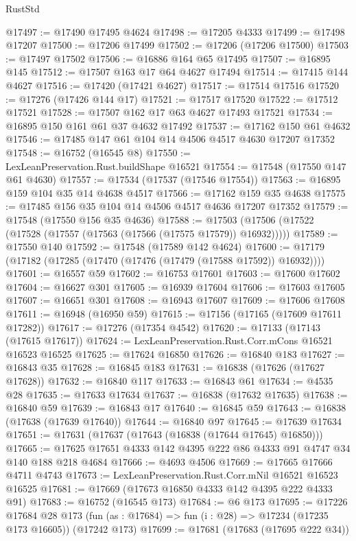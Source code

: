\begin{lexlean}{RustStd}
\begin{coremodule}
@17497 := @17490 @17495 @4624
@17498 := @17205 @4333
@17499 := @17498 @17207
@17500 := @17206 @17499
@17502 := @17206 (@17206 @17500)
@17503 := @17497 @17502
@17506 := @16886 @164 @65 @17495
@17507 := @16895 @145
@17512 := @17507 @163 @17 @64 @4627 @17494
@17514 := @17415 @144 @4627
@17516 := @17420 (@17421 @4627)
@17517 := @17514 @17516
@17520 := @17276 (@17426 @144 @17)
@17521 := @17517 @17520
@17522 := @17512 @17521
@17528 := @17507 @162 @17 @63 @4627 @17493 @17521
@17534 := @16895 @150 @161 @61 @37 @4632 @17492
@17537 := @17162 @150 @61 @4632
@17546 := @17485 @147 @61 @104 @14 @4506 @4517 @4630 @17207 @17352
@17548 := @16752 (@16545 @8)
@17550 := LexLeanPreservation.Rust.buildShape @16521
@17554 := @17548 (@17550 @147 @61 @4630)
@17557 := @17534 (@17537 (@17546 @17554))
@17563 := @16895 @159 @104 @35 @14 @4638 @4517
@17566 := @17162 @159 @35 @4638
@17575 := @17485 @156 @35 @104 @14 @4506 @4517 @4636 @17207 @17352
@17579 := @17548 (@17550 @156 @35 @4636)
@17588 := @17503 (@17506 (@17522 (@17528 (@17557 (@17563 (@17566 (@17575 @17579)) @16932)))))
@17589 := @17550 @140
@17592 := @17548 (@17589 @142 @4624)
@17600 := @17179 (@17182 (@17285 (@17470 (@17476 (@17479 (@17588 @17592)) @16932))))
@17601 := @16557 @59
@17602 := @16753 @17601
@17603 := @17600 @17602
@17604 := @16627 @301
@17605 := @16939 @17604
@17606 := @17603 @17605
@17607 := @16651 @301
@17608 := @16943 @17607
@17609 := @17606 @17608
@17611 := @16948 (@16950 @59)
@17615 := @17156 (@17165 (@17609 @17611 @17282))
@17617 := @17276 (@17354 @4542)
@17620 := @17133 (@17143 (@17615 @17617))
@17624 := LexLeanPreservation.Rust.Corr.mCons @16521 @16523 @16525
@17625 := @17624 @16850
@17626 := @16840 @183
@17627 := @16843 @35
@17628 := @16845 @183
@17631 := @16838 (@17626 (@17627 @17628))
@17632 := @16840 @117
@17633 := @16843 @61
@17634 := @4535 @28
@17635 := @17633 @17634
@17637 := @16838 (@17632 @17635)
@17638 := @16840 @59
@17639 := @16843 @17
@17640 := @16845 @59
@17643 := @16838 (@17638 (@17639 @17640))
@17644 := @16840 @97
@17645 := @17639 @17634
@17651 := @17631 (@17637 (@17643 (@16838 (@17644 @17645) @16850)))
@17665 := @17625 @17651 @4333 @142 @4395 @222 @86 @4333 @91 @4747 @34 @140 @188 @218 @4684
@17666 := @4693 @4506
@17669 := @17665 @17666 @4711 @4743
@17673 := LexLeanPreservation.Rust.Corr.mNil @16521 @16523 @16525
@17681 := @17669 (@17673 @16850 @4333 @142 @4395 @222 @4333 @91)
@17683 := @16752 (@16545 @173)
@17684 := @6 @173
@17695 := @17226
    @17684
    @28
    @173
    (fun (as : @17684) => fun (i : @28) => @17234 (@17235 @173 @16605))
    (@17242 @173)
@17699 := @17681 (@17683 (@17695 @222 @34))

\end{coremodule}
\end{lexlean}
